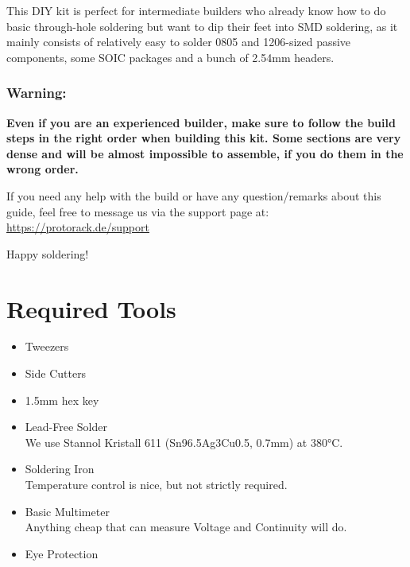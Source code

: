 \documentclass[12pt, a4paper]{article}
\begin{document}
\vspace{3mm}

This DIY kit is perfect for intermediate builders who already know how to do basic through-hole
soldering but want to dip their feet into SMD soldering, as it mainly consists of relatively
easy to solder 0805 and 1206-sized passive components, some SOIC packages and a bunch of 2.54mm
headers.

{
    \color{red}
    \subsubsection*{Warning:}
    \vspace{-3mm}
    \textbf{%
        Even if you are an experienced builder, make sure to follow the build steps in the right
        order when building this kit. Some sections are very dense and will be almost impossible
        to assemble, if you do them in the wrong order.
    }
    \vspace{5mm}
}

If you need any help with the build or have any question/remarks about this guide, feel free to
message us via the support page at:
\href{https://protorack.de/support}{https://protorack.de/support}

Happy soldering!

\pagebreak

\section*{Required Tools}

\begin{itemize}
    \item Tweezers
    \item Side Cutters
    \item 1.5mm hex key
    \item Lead-Free Solder
    \\ {\small We use Stannol Kristall 611 (Sn96.5Ag3Cu0.5, 0.7mm) at 380°C.}
    \item Soldering Iron
    \\ {\small Temperature control is nice, but not strictly required.}
    \item Basic Multimeter
    \\ {\small Anything cheap that can measure Voltage and Continuity will do.}
    \item Eye Protection
\end{itemize}
\end{document}
